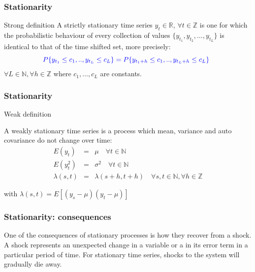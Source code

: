\documentclass{beamer}
\begin{document}
\begin{frame}
\frametitle{Stationarity}
\begin{block}{Strong definition}
A {\color{red}strictly stationary time series} $y_t \in \mathbb{R}$, $\forall t \in \mathbb{Z}$ is one for which the probabilistic behaviour of every collection of values $\{y_{t_1},y_{t_2},\dots,y_{t_L}\}$ is identical
to that of the time shifted set, more precisely:
\begin{equation*}
{\color{blue}
P\{y_{t_1} \leq
c_1,..,y_{t_L} \leq c_L\} = P\{y_{t_1+h} \leq c_1,..,y_{t_L+h} \leq c_L\}\enspace }
\end{equation*}
\noindent $\forall L \in \mathbb{N}, \forall h \in \mathbb{Z}$ where $c_1,\dots,c_L$ are constants.
\end{block}
\end{frame}

\begin{frame}
\frametitle{Stationarity}
\begin{block}{Weak definition}

A weakly stationary time series is a process which mean, variance and auto covariance do not change over time:
\small
{\color{blue}
 \begin{eqnarray*} E(y_t) &=& \mu  \quad
\forall t \in \mathbb{N} \\ E(y^2_t) &=& \sigma^2  \quad \forall t \in
\mathbb{N} \\ \lambda(s,t)&=&\lambda(s+h,t+h) \quad \forall s,t \in \mathbb{N},
\forall h \in \mathbb{Z} \end{eqnarray*}}
\end{block}
\noindent with $\lambda(s,t) = E[(y_s-\mu)(y_t - \mu)]$ 
\end{frame}

\begin{frame}
\frametitle{Stationarity: consequences}
One of the consequences of stationary processes is how they recover from a shock. A shock represents an unexpected change in a variable or a in its error term in a particular period of time. For stationary time series, shocks to the system will gradually die away. 
\end{frame}
\end{document}
